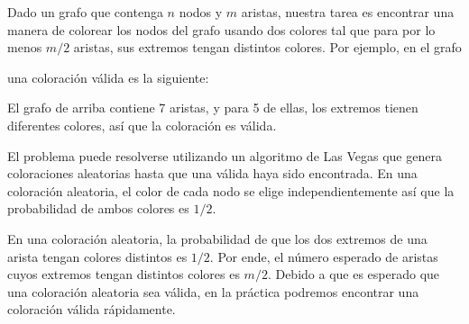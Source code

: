 Dado un grafo que contenga $n$ nodos y $m$ aristas, nuestra tarea es
encontrar una manera de colorear los nodos del grafo usando dos colores
tal que para por lo menos $m/2$ aristas, sus extremos tengan distintos
colores. Por ejemplo, en el grafo
\begin{center}
\end{center}
una coloración válida es la siguiente:
\begin{center}
\end{center}
El grafo de arriba contiene 7 aristas, y para 5 de ellas, los extremos
tienen diferentes colores, así que la coloración es válida.

El problema puede resolverse utilizando un algoritmo de Las Vegas que
genera coloraciones aleatorias hasta que una válida haya sido encontrada.
En una coloración aleatoria, el color de cada nodo se elige
independientemente así que la probabilidad de ambos colores es $1/2$.

En una coloración aleatoria, la probabilidad de que los dos extremos de
una arista tengan colores distintos es $1/2$. Por ende, el número esperado
de aristas cuyos extremos tengan distintos colores es $m/2$. Debido a que
es esperado que una coloración aleatoria sea válida, en la práctica
podremos encontrar una coloración válida rápidamente.